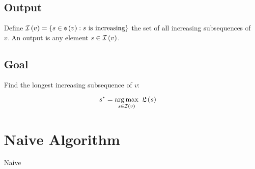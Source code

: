 \subsection{Output}

Define $\mathcal{I}\left(v\right) = \left\{  s \in \mathfrak{s}\left(v\right) : s \mbox{ is increasing} \right\}$ the set of all increasing subsequences of $v$. An output is any element $s \in \mathcal{I}\left(v\right)$.

\subsection{Goal}

Find the longest increasing subsequence of $v$:

\begin{equation}
    s^* = \operatorname*{arg\,max}\limits_{s \in \mathcal{I}\left(v\right)} \ \mathfrak{L}\left(s\right)
\end{equation}

\section{Naive Algorithm}

\begin{algorithm}[H]
    \caption{Naive}
    \label{longest-increasing-subsequence:algorithm:naive}
    \begin{algorithmic}[1]
    \end{algorithmic}
\end{algorithm}
